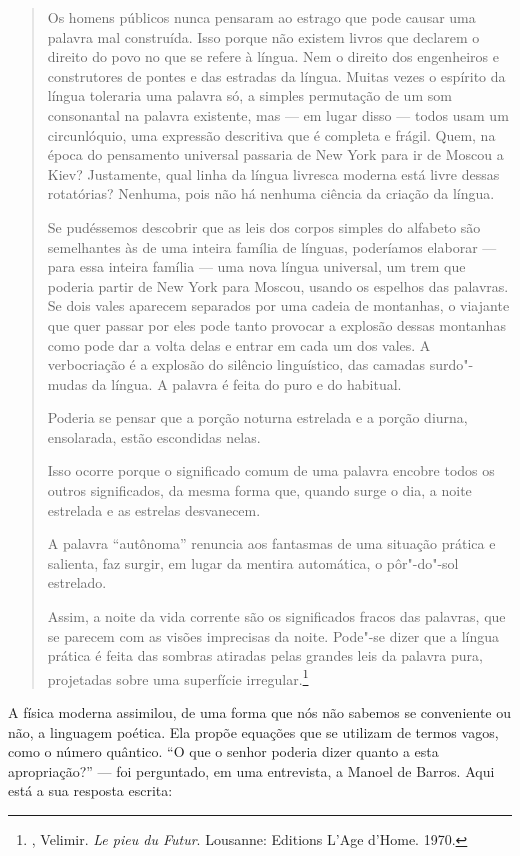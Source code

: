 \begin{quote}
Os homens públicos nunca pensaram ao estrago que pode causar uma palavra
mal construída. Isso porque não existem livros que declarem o direito do
povo no que se refere à língua. Nem o direito dos engenheiros e
construtores de pontes e das estradas da língua. Muitas vezes o espírito
da língua toleraria uma palavra só, a simples permutação de um som
consonantal na palavra existente, mas --- em lugar disso --- todos usam um
circunlóquio, uma expressão descritiva que é completa e frágil. Quem, na
época do pensamento universal passaria de New York para ir de Moscou a
Kiev? Justamente, qual linha da língua livresca moderna está livre
dessas rotatórias? Nenhuma, pois não há nenhuma ciência da criação da
língua.

Se pudéssemos descobrir que as leis dos corpos simples do alfabeto são
semelhantes às de uma inteira família de línguas, poderíamos elaborar ---
para essa inteira família --- uma nova língua universal, um trem que
poderia partir de New York para Moscou, usando os espelhos das palavras.
Se dois vales aparecem separados por uma cadeia de montanhas, o viajante
que quer passar por eles pode tanto provocar a explosão dessas montanhas
como pode dar a volta delas e entrar em cada um dos vales. A
verbocriação é a explosão do silêncio linguístico, das camadas
surdo"-mudas da língua. A palavra é feita do puro e do habitual.

Poderia se pensar que a porção noturna estrelada e a porção diurna,
ensolarada, estão escondidas nelas.

Isso ocorre porque o significado comum de uma palavra encobre todos os
outros significados, da mesma forma que, quando surge o dia, a noite
estrelada e as estrelas desvanecem.

A palavra ``autônoma'' renuncia aos fantasmas de uma situação prática e
salienta, faz surgir, em lugar da mentira automática, o pôr"-do"-sol
estrelado.

Assim, a noite da vida corrente são os significados fracos das palavras,
que se parecem com as visões imprecisas da noite. Pode"-se dizer que a
língua prática é feita das sombras atiradas pelas grandes leis da
palavra pura, projetadas sobre uma superfície irregular.\footnote{,
  Velimir. \emph{Le pieu du Futur}. Lousanne: Editions L'Age d'Home.
  1970.}
\end{quote}

A física moderna assimilou, de uma forma que nós não sabemos se
conveniente ou não, a linguagem poética. Ela propõe equações que se
utilizam de termos vagos, como o número quântico. ``O que o senhor poderia
dizer quanto a esta apropriação?'' --- foi perguntado, em uma entrevista, a
Manoel de Barros. Aqui está a sua resposta escrita:

